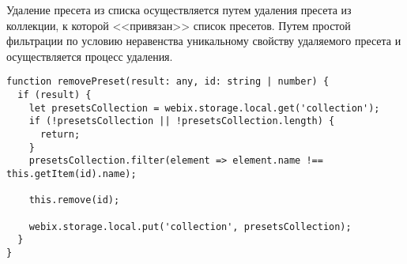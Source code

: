 Удаление пресета из списка осуществляется путем удаления пресета из коллекции, к которой <<привязан>> список пресетов. Путем простой фильтрации по условию неравенства уникальному свойству удаляемого пресета и осуществляется процесс удаления.

\begin{lstlisting}
function removePreset(result: any, id: string | number) {
  if (result) {
    let presetsCollection = webix.storage.local.get('collection');
    if (!presetsCollection || !presetsCollection.length) {
      return;
    }
    presetsCollection.filter(element => element.name !== this.getItem(id).name);

    this.remove(id);

    webix.storage.local.put('collection', presetsCollection);
  }
}
\end{lstlisting}